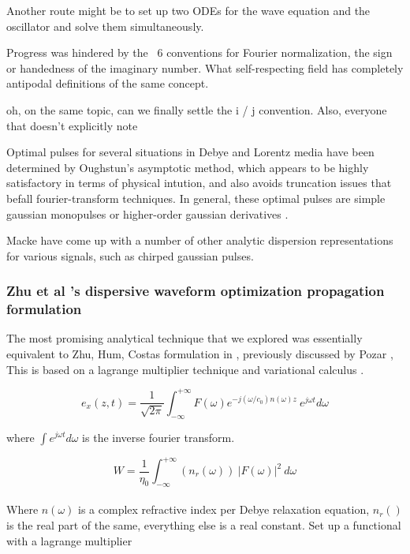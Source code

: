 \documentclass[paper.tex]{subfiles}
\begin{document}
Another route might be to set up two ODEs for the wave equation and the oscillator and solve them simultaneously.

Progress was hindered by the ~6 conventions for Fourier normalization, the sign or handedness of the imaginary number. What self-respecting field has completely antipodal definitions of the same concept.

oh, on the same topic, can we finally settle the i / j convention. Also, everyone that doesn't explicitly note  

Optimal pulses for several situations in Debye and Lorentz media have been determined by Oughstun's asymptotic method, which appears to be highly satisfactory in terms of physical intution, and also avoids truncation issues that befall fourier-transform techniques. In general, these optimal pulses are simple gaussian monopulses or higher-order gaussian derivatives \cite{Optimal2017} \cite{Optimal2015}. 

Macke \cite{Simple2012} have come up with a number of other analytic dispersion representations for various signals, such as chirped gaussian pulses.



\subsubsection{Zhu et al 's dispersive waveform optimization propagation formulation}

The most promising analytical technique that we explored was essentially equivalent to Zhu, Hum, 
Costas formulation in \cite{Microwave2012b}, previously discussed by Pozar \cite{Waveform2003}, 
This is based on a lagrange multiplier technique and variational 
calculus\cite{Methods1989} .

$$ e_x(z,t) = \frac{1}{\sqrt{2 \pi}} \int_{-\infty}^{+\infty}{F(\omega) e^{- j (\omega/c_0)n(\omega)z}\ e^{j\omega t} d\omega} $$

where $\int e^{j \omega t} d\omega$ is the inverse fourier transform.

$$W = \frac{1}{\eta_0} \int_{-\infty}^{+\infty}{(n_r(\omega))\ |F(\omega)|^2}\ d\omega$$\\

Where $n(\omega)$ is a complex refractive index per Debye relaxation equation, $n_r()$ is the real part of the same, everything else is a real constant. Set up a functional with a lagrange multiplier\\
\end{document}
